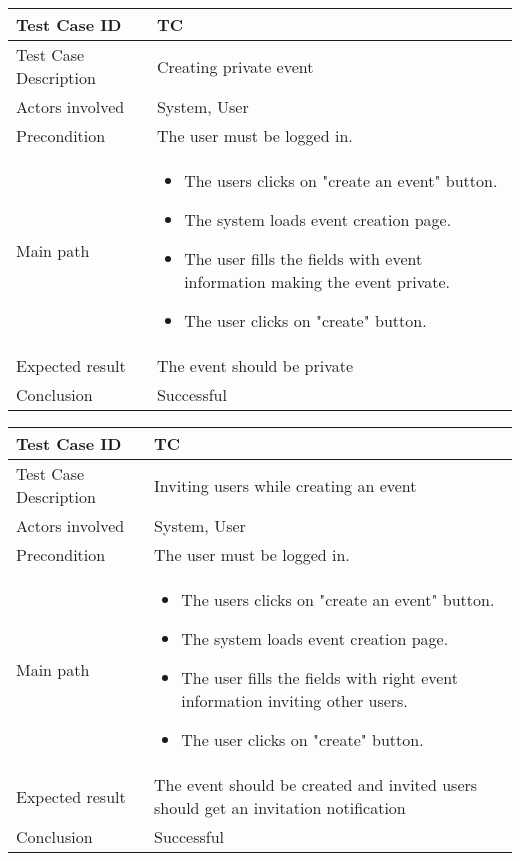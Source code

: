 \begin{center} \begin{tabular}{|l|l|}
  \hline
  Test Case ID & TC \z\\
  \hline
  Test Case Description & Creating private event\\
  \hline
  Actors involved & System, User\\
   \hline
  Precondition & The user must be logged in.\\
  \hline
  Main path &   \begin{minipage}{5in}
    \vskip 4pt
            \begin{itemize}
              \item The users clicks on "create an event" button.
              \item The system loads event creation page.
              \item The user fills the fields with event information making the event private.
              \item The user clicks on "create" button.
            \end{itemize}
    \vskip 4pt
  \end{minipage}  \\
  \hline
  Expected result & The event should be private\\
  \hline
  Conclusion & Successful\\
  \hline
\end{tabular} \end{center}

\begin{center} \begin{tabular}{|l|l|}
  \hline
  Test Case ID & TC \z\\
  \hline
  Test Case Description & Inviting users while creating an event\\
  \hline
  Actors involved & System, User\\
   \hline
  Precondition & The user must be logged in.\\
  \hline
  Main path &   \begin{minipage}{5in}
    \vskip 4pt
            \begin{itemize}
              \item The users clicks on "create an event" button.
              \item The system loads event creation page.
              \item The user fills the fields with right event information inviting other users.
              \item The user clicks on "create" button.
            \end{itemize}
    \vskip 4pt
  \end{minipage}  \\
  \hline
  Expected result & The event should be created and invited users should get an invitation notification\\
  \hline
  Conclusion & Successful\\
  \hline
\end{tabular} \end{center}

